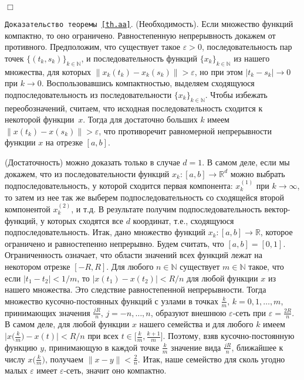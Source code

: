 \documentclass[12pt,a4paper]{article}
\newcommand{\re}{{\mathbb R}}
\newcommand{\n}{{\mathbb N}}
\begin{document}
   {\hfill $\Box$}
\medskip

{\tt Доказательство теоремы~\ref{th.aa}}. (Необходимость). Если множество функций компактно, то оно ограничено. Равностепенную непрерывность докажем от противного. Предположим, что 
 существует такое $\varepsilon > 0$, последовательность пар точек $\{(t_k, s_k)\}_{k \in \n}$, и последовательность 
функций $\{x_k\}_{k \in \n}$ из нашего множества, для которых $\|x_k(t_k) - x_k(s_k)\| > \varepsilon$, но при этом  
$|t_k - s_k| \to 0$ при $k \to 0$. Воспользовавшись компактностью, выделяем сходящуюся подпоследовательность 
из последовательности $\{x_k\}_{k \in \n}$. Чтобы избежать переобозначений, считаем, 
что исходная последовательность сходится к некоторой функции~$x$. 
Тогда для достаточно больших $k$ имеем $\|x(t_k) - x(s_k)\| > \varepsilon$, что 
противоречит равномерной непрерывности функции $x$ на отрезке $[a,b]$.  

(Достаточность) можно доказать только в случае $d=1$. В самом деле, если мы докажем, что из последовательности функций $x_k: [a, b] \to \re^d$ можно выбрать подпоследовательность, у которой сходится
первая компонента: $x_k^{(1)}$ при $k \to \infty$, то затем из нее так же выберем подпоследовательность со сходящейся второй компонентой $x_k^{(2)}$, и т.д. В результате получим подпоследовательность вектор-функций, у которых сходятся все
$d$ координат, т.е.,  сходящуюся подпоследовательность. Итак, дано множество функций $x_k: [a, b] \to \re$, которое ограничено и равностепенно непрерывно. Будем считать, что $[a, b] = [0,1]$. Ограниченность означает, что области значений всех функций лежат на некотором отрезке
$[-R, R]$. Для любого $n \in \n$ существует $m \in \n$ такое, что если $|t_1 - t_2| < 1/m$, то
$|x(t_1) - x(t_2)| < R/n$ для любой функции $x$ из нашего множества. Это следствие равностепенной непрерывности.
Тогда множество кусочно-постоянных функций с узлами в точках $\frac{k}{m}, \, k = 0, 1, \ldots , m$, принимающих
значения $\frac{jR}{n}, \, j = -n, \ldots , n$, образуют внешнюю $\varepsilon$-сеть при $\varepsilon = \frac{2R}{n}$.
В самом деле, для любой функции $x$ нашего семейства и для любого $k$ имеем
$\bigl|x\bigl(\frac{k}{m}\bigr) - x(t)\bigr| < R/n$ при всех  $t \in \bigl[\frac{k}{m},  \frac{k+1}{m} \bigr]$.
Поэтому, взяв кусочно-постоянную функцию $y$, принимающую в каждой точке $\frac{k}{m}$ значение вида $\frac{jR}{n}$,
ближайшее к числу $x\bigl(\frac{k}{m}\bigr)$, получаем $\|x - y\| < \frac{2}{n}$. Итак, наше семейство для сколь угодно малых $\varepsilon$ имеет $\varepsilon$-сеть, значит оно компактно.
\end{document}
